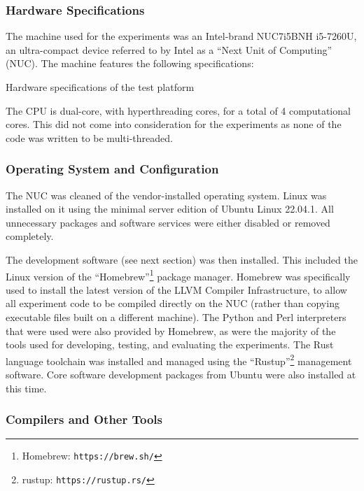 \subsubsection{Hardware Specifications}

The machine used for the experiments was an Intel-brand NUC7i5BNH i5-7260U, an ultra-compact device referred to by Intel as a ``Next Unit of Computing'' (NUC). The machine features the following specifications:

\begin{table}[h!]
\begin{center}

\caption{Hardware specifications of the test platform}
\end{center}
\label{table:hardware_specs}
\end{table}

The CPU is dual-core, with hyperthreading cores, for a total of 4 computational cores. This did not come into consideration for the experiments as none of the code was written to be multi-threaded.

\subsubsection{Operating System and Configuration}

The NUC was cleaned of the vendor-installed operating system. Linux was installed on it using the minimal server edition of Ubuntu Linux 22.04.1. All unnecessary packages and software services were either disabled or removed completely.

The development software (see next section) was then installed. This included the Linux version of the ``Homebrew''\footnote{Homebrew: \texttt{https://brew.sh/}} package manager. Homebrew was specifically used to install the latest version of the LLVM Compiler Infrastructure, to allow all experiment code to be compiled directly on the NUC (rather than copying executable files built on a different machine). The Python and Perl interpreters that were used were also provided by Homebrew, as were the majority of the tools used for developing, testing, and evaluating the experiments. The Rust language toolchain was installed and managed using the ``Rustup''\footnote{rustup: \texttt{https://rustup.rs/}} management software. Core software development packages from Ubuntu were also installed at this time.

\subsubsection{Compilers and Other Tools}

